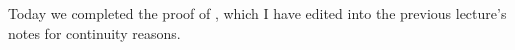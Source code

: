 \documentclass[../notes.tex]{subfiles}
\begin{document}
Today we completed the proof of , which I have edited into the previous lecture's notes for continuity reasons.
\end{document}
